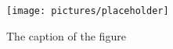 \documentclass[12pt, oneside]{report}
\begin{document}
\begin{appendices}

\unpacklipsum[141][1-3]
\chapter{\lipsumexp}
\lipsum[140][4]

\begin{figure}[h]
  \centering
  \texttt{[image: pictures/placeholder]}
  \caption{The caption of the figure}
  \label{fig:BlockDiagram4}
\end{figure}

\section{\lipsum[140][3]}
\lipsum[8-9]

\section{\lipsum[140][5]}
\lipsum[10]

\unpacklipsum[140][6]
\chapter{\lipsumexp}
\lipsum[11] \cite{einstein, latexcompanion, knuthwebsite}


\end{appendices}
\end{document}

